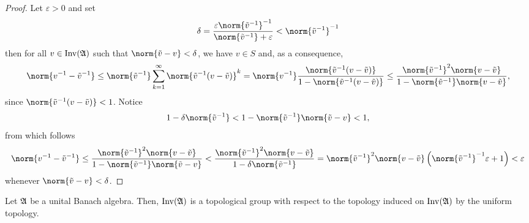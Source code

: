 \begin{proof}
    Let \(\varepsilon > 0\) and set
    \begin{equation*}
        \delta = \frac{\varepsilon\norm{\tilde{v}^{-1}}^{-1}}{\norm{\tilde{v}^{-1}} + \varepsilon} < \norm{\tilde{v}^{-1}}^{-1}
    \end{equation*}
    then for all \(v \in \operatorname{Inv}(\mathfrak{A})\) such that \(\norm{\tilde{v} - v} < \delta\),  we have \(v \in S\) and, as a consequence,
    \begin{equation*}
        \norm{v^{-1} - \tilde{v}^{-1}} \leq \norm{\tilde{v}^{-1}} \sum_{k=1}^\infty \norm{\tilde{v}^{-1}(v - \tilde{v})}^k = \norm{v^{-1}} \frac{\norm{\tilde{v}^{-1}(v - \tilde{v})}}{1 - \norm{\tilde{v}^{-1}(v - \tilde{v})}} \leq \frac{\norm{\tilde{v}^{-1}}^2\norm{v - \tilde{v}}}{1 - \norm{\tilde{v}^{-1}}\norm{v - \tilde{v}}},
    \end{equation*}
    since \(\norm{\tilde{v}^{-1}(v-\tilde{v})} < 1\). Notice
    \begin{equation*}
        1 - \delta \norm{\tilde{v}^{-1}} < 1 - \norm{\tilde{v}^{-1}}\norm{\tilde{v} - v} < 1,
    \end{equation*}
    from which follows
    \begin{align*}
        \norm{v^{-1} - \tilde{v}^{-1}} \leq \frac{\norm{\tilde{v}^{-1}}^2\norm{v - \tilde{v}}}{1 - \norm{\tilde{v}^{-1}} \norm{\tilde{v} - v}} < \frac{\norm{\tilde{v}^{-1}}^2\norm{v - \tilde{v}}}{1 - \delta \norm{\tilde{v}^{-1}}} = \norm{\tilde{v}^{-1}}^2\norm{v - \tilde{v}}\left(\norm{\tilde{v}^{-1}}^{-1}\varepsilon + 1\right) < \varepsilon
    \end{align*}
    whenever \(\norm{\tilde{v} - v} < \delta\).
\end{proof}
\begin{corollary}
    Let \(\mathfrak{A}\) be a unital Banach algebra. Then, \(\operatorname{Inv}(\mathfrak{A})\) is a topological group with respect to the topology induced on \(\operatorname{Inv}(\mathfrak{A})\) by the uniform topology.
\end{corollary}
